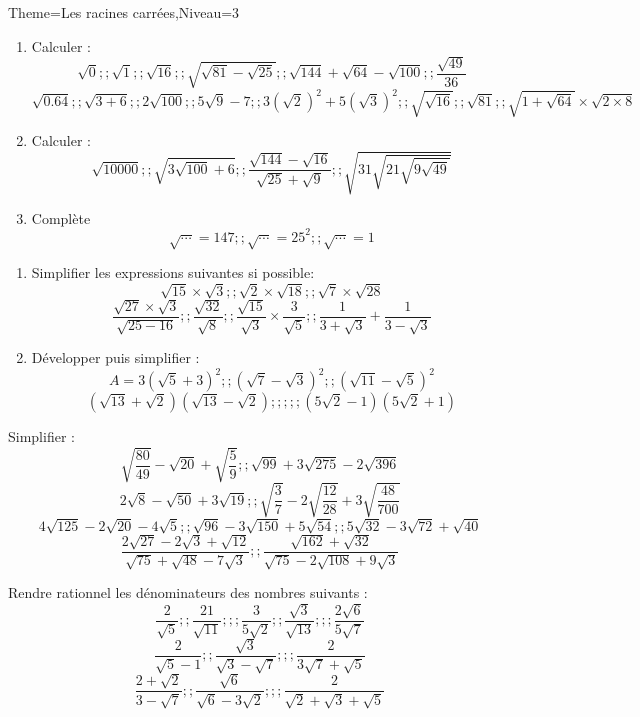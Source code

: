 \documentclass[a4paper,12pt]{article}
\begin{document}
\begin{Maquette}[Fiche]{Theme=Les racines carrées,Niveau=3}

\begin{exercice}
\begin{enumerate}
\item Calculer :
$$\sqrt{0};;\sqrt{1};;\sqrt{16};;\sqrt{\sqrt{81}-\sqrt{25}} ;;\sqrt{144}+\sqrt{64}-\sqrt{100};;\dfrac{\sqrt{49}}{36}$$
$$\sqrt{0.64};;\sqrt{3+6};;2\sqrt{100};;5\sqrt{9}-7;;3(\sqrt{2})^{2}+5(\sqrt{3})^{2};;\sqrt{\sqrt{16}};;\sqrt{81};;\sqrt{1+\sqrt{64}}\times \sqrt{2\times 8} $$
\item Calculer :
$$\sqrt{10000};;\sqrt{3\sqrt{100}+6};;\dfrac{\sqrt{144}-\sqrt{16}}{\sqrt{25}+\sqrt{9}};;\sqrt{31\sqrt{21\sqrt{9\sqrt{49}}}} $$
\item Complète
$$\sqrt{\cdots}=147 ;;\sqrt{\cdots}=25^{2} ;;\sqrt{\cdots}=1 $$
\end{enumerate}
\end{exercice}

\begin{exercice}
\begin{enumerate}
\item Simplifier les expressions suivantes si possible:
$$\sqrt{15}\times\sqrt{3};;\sqrt{2}\times\sqrt{18};;\sqrt{7}\times\sqrt{28} $$
$$\dfrac{\sqrt{27}\times\sqrt{3}}{\sqrt{25-16}} ;;\dfrac{\sqrt{32}}{\sqrt{8}};;\dfrac{\sqrt{15}}{\sqrt{3}}\times\dfrac{3}{\sqrt{5}};;\dfrac{1}{3+\sqrt{3}}+\dfrac{1}{3-\sqrt{3}}$$
\item Développer puis simplifier :
$$A=3(\sqrt{5}+3)^{2};;(\sqrt{7}-\sqrt{3})^{2};;(\sqrt{11}-\sqrt{5})^{2} $$
$$(\sqrt{13}+\sqrt{2})(\sqrt{13}-\sqrt{2});;;;;(5\sqrt{2}-1)(5\sqrt{2}+1) $$
\end{enumerate}
\end{exercice}

\begin{exercice}
Simplifier :
$$\sqrt{\dfrac{80}{49}}-\sqrt{20}+\sqrt{\dfrac{5}{9}};;\sqrt{99}+3\sqrt{275}-2\sqrt{396} $$
$$2\sqrt{8}-\sqrt{50}+3\sqrt{19};;\sqrt{\dfrac{3}{7}}-2\sqrt{\dfrac{12}{28}}+3\sqrt{\dfrac{48}{700}} $$
$$4\sqrt{125}-2\sqrt{20}-4\sqrt{5};;\sqrt{96}-3\sqrt{150}+5\sqrt{54};;5\sqrt{32}-3\sqrt{72}+\sqrt{40} $$
$$\dfrac{2\sqrt{27}-2\sqrt{3}+\sqrt{12}}{\sqrt{75}+\sqrt{48}-7\sqrt{3}} ;; \dfrac{\sqrt{162}+\sqrt{32}}{\sqrt{75}-2\sqrt{108}+9\sqrt{3}}$$

\end{exercice}

\begin{exercice}
Rendre rationnel les dénominateurs des nombres suivants :
$$\dfrac{2}{\sqrt{5}};;\dfrac{21}{\sqrt{11}};;;\dfrac{3}{5\sqrt{2}};;\dfrac{\sqrt{3}}{\sqrt{13}};;;\dfrac{2\sqrt{6}}{5\sqrt{7}} $$
$$\dfrac{2}{\sqrt{5}-1};;\dfrac{\sqrt{3}}{\sqrt{3}-\sqrt{7}};;;\dfrac{2}{3\sqrt{7}+\sqrt{5}} $$
$$\dfrac{2+\sqrt{2}}{3-\sqrt{7}};;\dfrac{\sqrt{6}}{\sqrt{6}-3\sqrt{2}};;;\dfrac{2}{\sqrt{2}+\sqrt{3}+\sqrt{5}} $$
\end{exercice}


\end{Maquette}
\end{document}
